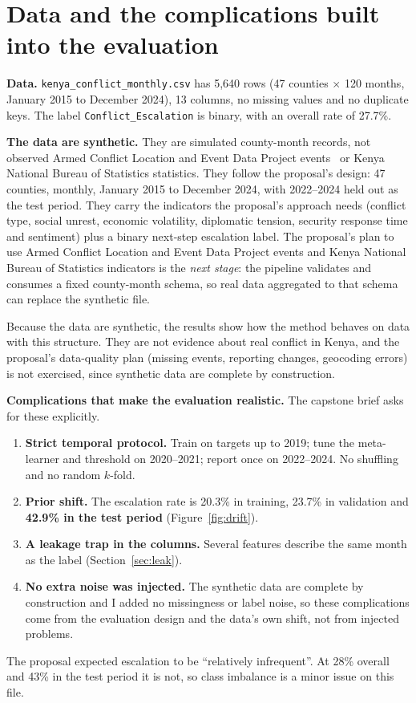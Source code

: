 \documentclass[11pt,a4paper]{article}
\newcommand{\code}[1]{\texttt{#1}}
\begin{document}
\section{Data and the complications built into the evaluation}
\textbf{Data.} \code{kenya\_conflict\_monthly.csv} has 5{,}640 rows (47 counties $\times$ 120 months, January 2015 to
December 2024), 13 columns, no missing values and no duplicate keys. The label \code{Conflict\_Escalation} is binary, with an
overall rate of 27.7\%.

\textbf{The data are synthetic.} They are simulated county-month records, not observed Armed Conflict Location and Event Data Project events~\cite{raleigh2010} or Kenya National Bureau of Statistics statistics.
They follow the proposal's design: 47 counties, monthly, January 2015 to December 2024, with 2022--2024 held out as the test period.
They carry the indicators the proposal's approach needs (conflict type, social unrest, economic volatility, diplomatic tension, security response time and sentiment)
plus a binary next-step escalation label. The proposal's plan to use Armed Conflict Location and Event Data Project events and Kenya National Bureau of Statistics indicators is the \emph{next stage}: the pipeline validates and consumes a fixed
county-month schema, so real data aggregated to that schema can replace the synthetic file.

Because the data are synthetic, the results show how the method behaves on data with this structure. They are not evidence about real conflict in Kenya,
and the proposal's data-quality plan (missing events, reporting changes, geocoding errors) is not exercised, since synthetic data are complete by construction.

\textbf{Complications that make the evaluation realistic.} The capstone brief asks for these explicitly.
\begin{enumerate}
  \item \textbf{Strict temporal protocol.} Train on targets up to 2019; tune the meta-learner and threshold on 2020--2021; report once on 2022--2024. No shuffling and no random $k$-fold.
  \item \textbf{Prior shift.} The escalation rate is 20.3\% in training, 23.7\% in validation and \textbf{42.9\% in the test period} (Figure~\ref{fig:drift}).
  \item \textbf{A leakage trap in the columns.} Several features describe the same month as the label (Section~\ref{sec:leak}).
  \item \textbf{No extra noise was injected.} The synthetic data are complete by construction and I added no missingness or label noise, so these complications come from the evaluation design and the data's own shift, not from injected problems.
\end{enumerate}
The proposal expected escalation to be ``relatively infrequent''. At 28\% overall and 43\% in the test period it is not,
so class imbalance is a minor issue on this file.
\end{document}
